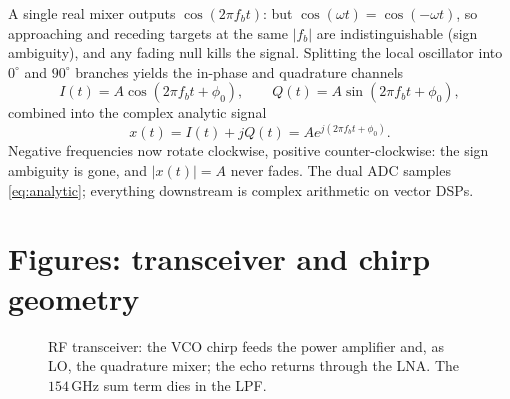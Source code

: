 \documentclass[11pt,oneside]{book}
\begin{document}
A single real mixer outputs $\cos(2\pi f_b t)$: but
$\cos(\omega t)=\cos(-\omega t)$, so approaching and receding targets at the
same $|f_b|$ are indistinguishable (sign ambiguity), and any fading null
kills the signal. Splitting the local oscillator into $0^\circ$ and $90^\circ$
branches yields the in-phase and quadrature channels
\begin{equation}
I(t)=A\cos(2\pi f_b t+\phi_0),\qquad
Q(t)=A\sin(2\pi f_b t+\phi_0),
\label{eq:iq}
\end{equation}
combined into the complex analytic signal
\begin{equation}
\boxed{x(t)=I(t)+jQ(t)=Ae^{j(2\pi f_b t+\phi_0)}.}
\label{eq:analytic}
\end{equation}
Negative frequencies now rotate clockwise, positive counter-clockwise: the
sign ambiguity is gone, and $|x(t)|=A$ never fades. The dual ADC samples
\cref{eq:analytic}; everything downstream is complex arithmetic on vector
DSPs.

\section{Figures: transceiver and chirp geometry}
\label{sec:ch1-figs}

\begin{figure}[htbp]
\centering
{}
\caption{RF transceiver: the VCO chirp feeds the power amplifier and, as LO,
the quadrature mixer; the echo returns through the LNA. The $154\,\mathrm{GHz}$
sum term dies in the LPF.}
\label{fig:transceiver}
\end{figure}
\end{document}

